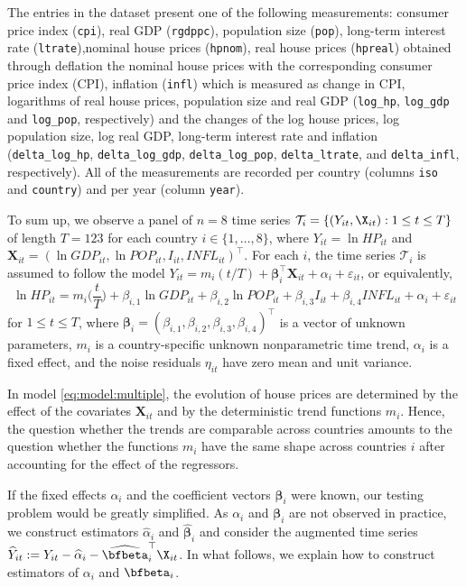 \documentclass[a4paper]{article}
\begin{document}
The entries in the dataset present one of the following measurements: consumer price index (\verb|cpi|), real GDP (\verb|rgdppc|), population size (\verb|pop|), long-term interest rate (\verb|ltrate|),nominal house prices (\verb|hpnom|), real house prices (\verb|hpreal|) obtained through deflation the nominal house prices with the corresponding consumer price index (CPI), inflation (\verb|infl|) which is measured as change in CPI, logarithms of real house prices, population size and real GDP (\verb|log_hp|, \verb|log_gdp| and \verb|log_pop|, respectively) and the changes of the log house prices, log population size, log real GDP, long-term interest rate and inflation (\verb|delta_log_hp|, \verb|delta_log_gdp|, \verb|delta_log_pop|, \verb|delta_ltrate|, and \verb|delta_infl|, respectively). All of the measurements are recorded per country (columns \verb|iso| and \verb|country|) and per year (column \verb|year|).

To sum up, we observe a panel of $n = 8$ time series $\mathcal{T}_i = \{(Y_{it}, \X_{it}): 1 \le t \le T \}$ of length $T = 123$ for each country $i \in \{1,\ldots, 8\}$, where $Y_{it} = \ln HP_{it}$ and $\mathbf{X}_{it} = (\ln GDP_{it}, \ln POP_{it}, I_{it}, INFL_{it})^\top$. For each $i$, the time series $\mathcal{T}_i$ is assumed to follow the model $Y_{it} = m_i(t/T) + \bm{\beta}^\top_i \mathbf{X}_{it} + \alpha_i + \varepsilon_{it}$, or equivalently, 
\begin{equation}\label{eq:model:multiple}
\ln HP_{it} =  m_i \Big( \frac{t}{T} \Big) + \beta_{i, 1} \ln GDP_{it} + \beta_{i, 2} \ln POP_{it} + \beta_{i, 3} I_{it} + \beta_{i, 4} INFL_{it} + \alpha_i + \varepsilon_{it}
\end{equation}
for $1 \le t \le T$, where $\bm{\beta}_i = (\beta_{i, 1}, \beta_{i, 2}, \beta_{i, 3}, \beta_{i, 4})^\top$ is a vector of unknown parameters, $m_i$ is a country-specific unknown nonparametric time trend, $\alpha_i$ is a fixed effect, and the noise residuals $\eta_{it}$ have zero mean and unit variance.

In model \eqref{eq:model:multiple}, the evolution of house prices are determined by the effect of the covariates $\mathbf{X}_{it}$ and by the deterministic trend functions $m_i$. Hence, the question whether the trends are comparable across countries amounts to the question whether the functions $m_i$ have the same shape across countries $i$ after accounting for the effect of the regressors.

If the fixed effects $\alpha_i$ and the coefficient vectors $\bm{\beta}_i$ were known, our testing problem would be greatly simplified. As $\alpha_i$ and $\bm{\beta}_i$ are not observed in practice, we construct estimators $\widehat{\alpha}_i$ and $\widehat{\bm{\beta}}_i$ and consider the augmented time series $\widehat{Y}_{it} := Y_{it} -\widehat{\alpha}_i - \widehat{\bfbeta}_i^\top \X_{it}$. In what follows, we explain how to construct estimators of $\alpha_i$ and $\bfbeta_i$. 
\end{document}
